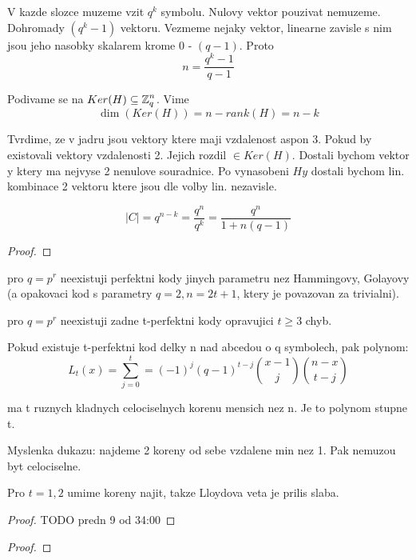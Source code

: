 	V kazde slozce muzeme vzit $q^k$ symbolu. Nulovy vektor pouzivat nemuzeme. Dohromady $(q^k - 1)$ vektoru. Vezmeme nejaky vektor, linearne zavisle s nim jsou jeho nasobky skalarem krome 0 - $(q - 1)$. Proto
	\[ n = \frac{q^k - 1}{q - 1} \]

	Podivame se na $Ker(H) \subseteq \operatorname{\mathbb{Z}}_q^n$. Vime
	\[ \dim(Ker(H)) = n - rank(H) = n - k \]

	Tvrdime, ze v jadru jsou vektory ktere maji vzdalenost aspon 3. Pokud by existovali vektory vzdalenosti 2. Jejich rozdil $\in Ker(H)$.
	Dostali bychom vektor y ktery ma nejvyse 2 nenulove souradnice. Po vynasobeni $Hy$ dostali bychom lin. kombinace 2 vektoru ktere jsou dle volby lin. nezavisle.

	\[ |C| = q^{n - k} = \frac{q^n}{q^k} = \frac{q^n}{1 + n(q-1)} \]
\begin{proof}
\end{proof}

\begin{theorem}
	pro $q = p^r$ neexistuji perfektni kody jinych parametru nez Hammingovy, Golayovy (a opakovaci kod s parametry $q = 2, n = 2t + 1$, ktery je povazovan za trivialni).
\end{theorem}

\begin{theorem}
	pro $q = p^r$ neexistuji zadne t-perfektni kody opravujici $t \geq 3$ chyb.
\end{theorem}

\begin{theorem}[Lloyd]
	Pokud existuje t-perfektni kod delky n nad abcedou o q symbolech, pak polynom:
	\[ L_t(x) = \sum_{j = 0}^t = (-1)^j(q - 1)^{t - j} \binom{x - 1}{j} \binom{n - x}{t - j} \]

	ma t ruznych kladnych celociselnych korenu mensich nez n. Je to polynom stupne t.

	Myslenka dukazu: najdeme 2 koreny od sebe vzdalene min nez 1. Pak nemuzou byt celociselne.

	Pro $t = 1,2$ umime koreny najit, takze Lloydova veta je prilis slaba.
\end{theorem}
\begin{proof}
	TODO predn 9 od 34:00
\end{proof}

\begin{lemma}
\end{lemma}
\begin{proof}
\end{proof}
